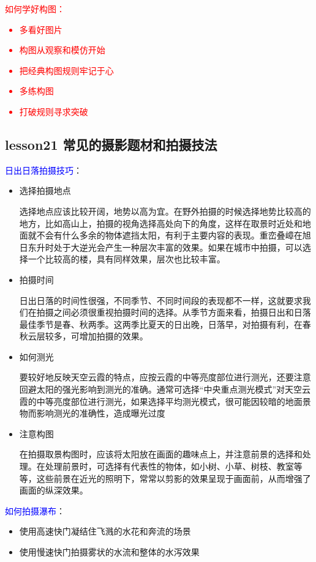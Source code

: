 \documentclass{book}
\begin{document}
\textcolor{red}{如何学好构图：\begin{itemize}
         \item 多看好图片
         \item 构图从观察和模仿开始
         \item 把经典构图规则牢记于心
         \item 多练构图
         \item 打破规则寻求突破
       \end{itemize}}

\subsection{lesson21 常见的摄影题材和拍摄技法}

\textcolor{blue}{日出日落拍摄技巧}：\begin{itemize}
           \item 选择拍摄地点

           选择地点应该比较开阔，地势以高为宜。在野外拍摄的时候选择地势比较高的地方，比如高山上，拍摄的视角选择高处向下的角度，这样在取景时近处和地面就不会有什么多余的物体遮挡太阳，有利于主要内容的表现。重峦叠嶂在旭日东升时处于大逆光会产生一种层次丰富的效果。如果在城市中拍摄，可以选择一个比较高的楼，具有同样效果，层次也比较丰富。
           \item 拍摄时间

           日出日落的时间性很强，不同季节、不同时间段的表现都不一样，这就要求我们在拍摄之间必须很重视拍摄时间的选择。从季节方面来看，拍摄日出和日落最佳季节是春、秋两季。这两季比夏天的日出晚，日落早，对拍摄有利，在春秋云层较多，可增加拍摄的效果。
           \item 如何测光

           要较好地反映天空云霞的特点，应按云霞的中等亮度部位进行测光，还要注意回避太阳的强光影响到测光的准确。通常可选择“中央重点测光模式”对天空云霞的中等亮度部位进行测光，如果选择平均测光模式，很可能因较暗的地面景物而影响测光的准确性，造成曝光过度
           \item 注意构图

           在拍摄取景构图时，应该将太阳放在画面的趣味点上，并注意前景的选择和处理。在处理前景时，可选择有代表性的物体，如小树、小草、树枝、教室等等，这些前景在近光的照明下，常常以剪影的效果呈现于画面前，从而增强了画面的纵深效果。
         \end{itemize}

\textcolor{blue}{如何拍摄瀑布}：\begin{itemize}
                           \item 使用高速快门凝结住飞溅的水花和奔流的场景
                           \item 使用慢速快门拍摄雾状的水流和整体的水泻效果
                         \end{itemize}
\end{document}
